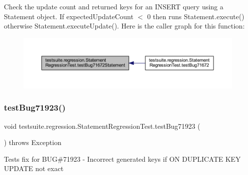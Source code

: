 Check the update count and returned keys for an I\+N\+S\+E\+RT query using a Statement object. If expected\+Update\+Count $<$ 0 then runs Statement.\+execute() otherwise Statement.\+execute\+Update(). Here is the caller graph for this function\+:
\nopagebreak
\begin{figure}[H]
\begin{center}
\leavevmode
\includegraphics[width=350pt]{classtestsuite_1_1regression_1_1_statement_regression_test_abb13639717a457989454d73d4dbc02b8_icgraph}
\end{center}
\end{figure}
\mbox{\label{classtestsuite_1_1regression_1_1_statement_regression_test_a3676f906ace9714006ad7a71ab1e4211}} 
\subsubsection{\texorpdfstring{test\+Bug71923()}{testBug71923()}}
{\footnotesize\ttfamily void testsuite.\+regression.\+Statement\+Regression\+Test.\+test\+Bug71923 (\begin{DoxyParamCaption}{ }\end{DoxyParamCaption}) throws Exception}

Tests fix for B\+UG\#71923 -\/ Incorrect generated keys if ON D\+U\+P\+L\+I\+C\+A\+TE K\+EY U\+P\+D\+A\+TE not exact


